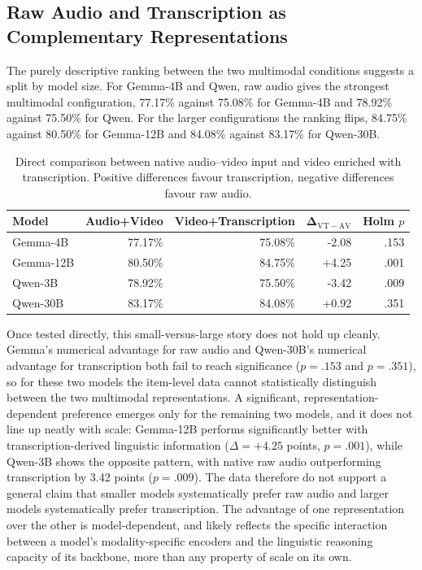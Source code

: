 \subsection*{Raw Audio and Transcription as Complementary Representations}
\label{subsec:audio_vs_textualized_audio}
The purely descriptive ranking between the two multimodal conditions suggests a split by model size. For Gemma-4B    and Qwen, raw audio gives the strongest multimodal configuration, 77.17\% against 75.08\% for Gemma-4B    and 78.92\% against 75.50\% for Qwen. For the larger configurations the ranking flips, 84.75\% against 80.50\% for Gemma-12B and 84.08\% against 83.17\% for Qwen-30B.
\begin{table}[ht]
    \centering
    \small
    \begin{tabular}{lrrrr}
        \hline
        \textbf{Model} &
        \textbf{Audio+Video} &
        \textbf{Video+Transcription} &
        $\boldsymbol{\Delta_{\mathrm{VT-AV}}}$ &
        \textbf{Holm $p$} \\
        \hline
        Gemma-4B          & 77.17\% & 75.08\% & -2.08 & .153 \\
        Gemma-12B & 80.50\% & 84.75\% & +4.25 & .001 \\
        Qwen-3B        & 78.92\% & 75.50\% & -3.42 & .009 \\
        Qwen-30B    & 83.17\% & 84.08\% & +0.92 & .351 \\
        \hline
    \end{tabular}
    \caption{Direct comparison between native audio--video input and video enriched with transcription. Positive differences favour transcription, negative differences favour raw audio.}
    \label{tab:mcnemar_audio_vs_transcription}
\end{table}
Once tested directly, this small-versus-large story does not hold up cleanly. Gemma's numerical advantage for raw audio and Qwen-30B's numerical advantage for transcription both fail to reach significance ($p=.153$ and $p=.351$), so for these two models the item-level data cannot statistically distinguish between the two multimodal representations. A significant, representation-dependent preference emerges only for the remaining two models, and it does not line up neatly with scale: Gemma-12B performs significantly better with transcription-derived linguistic information ($\Delta=+4.25$ points, $p=.001$), while Qwen-3B shows the opposite pattern, with native raw audio outperforming transcription by 3.42 points ($p=.009$).
The data therefore do not support a general claim that smaller models systematically prefer raw audio and larger models systematically prefer transcription. The advantage of one representation over the other is model-dependent, and likely reflects the specific interaction between a model's modality-specific encoders and the linguistic reasoning capacity of its backbone, more than any property of scale on its own.
